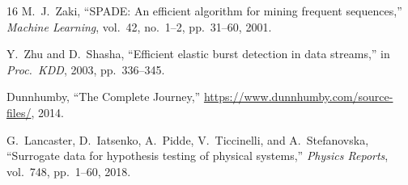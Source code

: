 \documentclass[11pt,a4paper]{article}
\begin{document}
\begin{thebibliography}{16}
M.~J.~Zaki,
``SPADE: An efficient algorithm for mining frequent sequences,''
\emph{Machine Learning}, vol.~42, no.~1--2, pp.~31--60, 2001.

Y.~Zhu and D.~Shasha,
``Efficient elastic burst detection in data streams,''
in \emph{Proc.\ KDD}, 2003, pp.~336--345.

Dunnhumby,
``The Complete Journey,''
\url{https://www.dunnhumby.com/source-files/}, 2014.

G.~Lancaster, D.~Iatsenko, A.~Pidde, V.~Ticcinelli, and A.~Stefanovska,
``Surrogate data for hypothesis testing of physical systems,''
\emph{Physics Reports}, vol.~748, pp.~1--60, 2018.

\end{thebibliography}
\end{document}
